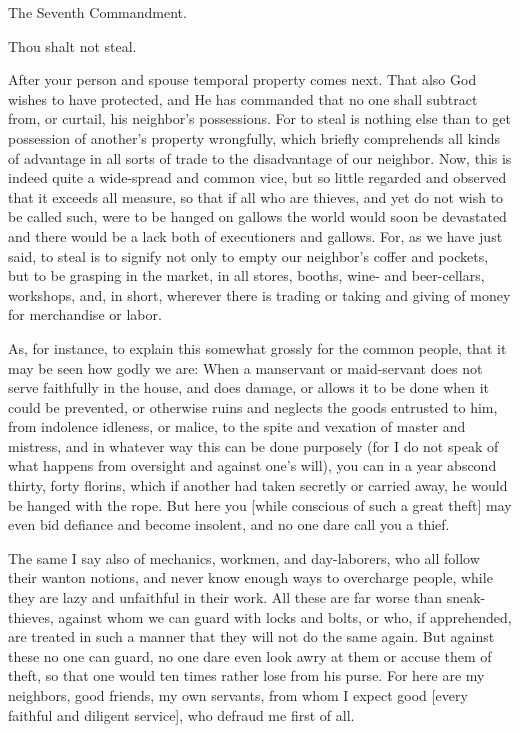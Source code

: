  The Seventh Commandment.

Thou shalt not steal.

After your person and spouse temporal property comes next. That also
God wishes to have protected, and He has commanded that no one shall
subtract from, or curtail, his neighbor's possessions. For to steal is
nothing else than to get possession of another's property wrongfully,
which briefly comprehends all kinds of advantage in all sorts of trade
to the disadvantage of our neighbor. Now, this is indeed quite a
wide-spread and common vice, but so little regarded and observed that
it exceeds all measure, so that if all who are thieves, and yet do not
wish to be called such, were to be hanged on gallows the world would
soon be devastated and there would be a lack both of executioners and
gallows. For, as we have just said, to steal is to signify not only to
empty our neighbor's coffer and pockets, but to be grasping in the
market, in all stores, booths, wine- and beer-cellars, workshops, and,
in short, wherever there is trading or taking and giving of money for
merchandise or labor.

As, for instance, to explain this somewhat grossly for the common
people, that it may be seen how godly we are: When a manservant or
maid-servant does not serve faithfully in the house, and does damage,
or allows it to be done when it could be prevented, or otherwise ruins
and neglects the goods entrusted to him, from indolence idleness, or
malice, to the spite and vexation of master and mistress, and in
whatever way this can be done purposely (for I do not speak of what
happens from oversight and against one's will), you can in a year
abscond thirty, forty florins, which if another had taken secretly or
carried away, he would be hanged with the rope. But here you [while
conscious of such a great theft] may even bid defiance and become
insolent, and no one dare call you a thief.

The same I say also of mechanics, workmen, and day-laborers, who all
follow their wanton notions, and never know enough ways to overcharge
people, while they are lazy and unfaithful in their work. All these are
far worse than sneak-thieves, against whom we can guard with locks and
bolts, or who, if apprehended, are treated in such a manner that they
will not do the same again. But against these no one can guard, no one
dare even look awry at them or accuse them of theft, so that one would
ten times rather lose from his purse. For here are my neighbors, good
friends, my own servants, from whom I expect good [every faithful and
diligent service], who defraud me first of all.

